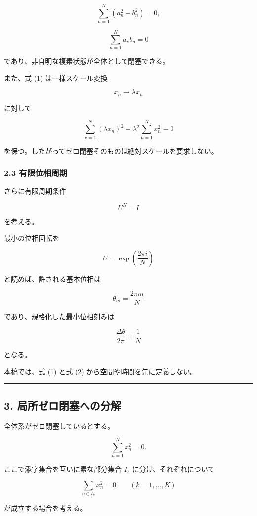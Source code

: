 \documentclass[
  a4paper,
]{ltjsarticle}
\begin{document}
\[
\sum_{n=1}^{N}(a_n^2-b_n^2)=0,
\]

\[
\sum_{n=1}^{N}a_n b_n=0
\]

であり、非自明な複素状態が全体として閉塞できる。

また、式 (1) は一様スケール変換

\[
x_n\rightarrow\lambda x_n
\]

に対して

\[
\sum_{n=1}^{N}(\lambda x_n)^2
=
\lambda^2\sum_{n=1}^{N}x_n^2
=
0
\]

を保つ。したがってゼロ閉塞そのものは絶対スケールを要求しない。

\subsubsection{2.3
有限位相周期}\label{ux6709ux9650ux4f4dux76f8ux5468ux671f}

さらに有限周期条件

\[
U^N=I
\tag{2}
\]

を考える。

最小の位相回転を

\[
U=\exp\left(\frac{2\pi i}{N}\right)
\]

と読めば、許される基本位相は

\[
\theta_m=\frac{2\pi m}{N}
\]

であり、規格化した最小位相刻みは

\[
\frac{\Delta\theta}{2\pi}
=
\frac{1}{N}
\tag{3}
\]

となる。

本稿では、式 (1) と式 (2) から空間や時間を先に定義しない。

\begin{center}\rule{0.5\linewidth}{0.5pt}\end{center}

\subsection{3.
局所ゼロ閉塞への分解}\label{ux5c40ux6240ux30bcux30edux9589ux585eux3078ux306eux5206ux89e3}

全体系がゼロ閉塞しているとする。

\[
\sum_{n=1}^{N}x_n^2=0.
\]

ここで添字集合を互いに素な部分集合 \(I_k\) に分け、それぞれについて

\[
\sum_{n\in I_k}x_n^2=0
\qquad
(k=1,\ldots,K)
\tag{4}
\]

が成立する場合を考える。
\end{document}
